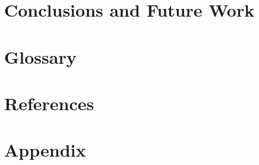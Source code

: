\documentclass[a4paper, 12pt]{article}
\begin{document}
\newpage

\section{Conclusions and Future Work}
\newpage

\section{Glossary}
\newpage


\section{References}
\printbibliography[heading=none]
\newpage

\section{Appendix}
\newpage
\end{document}
